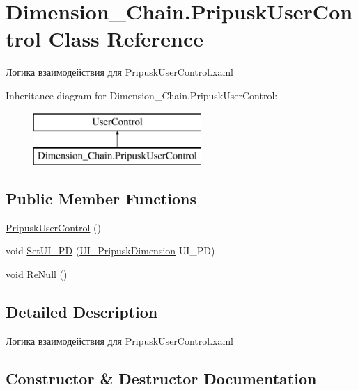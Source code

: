 \hypertarget{class_dimension___chain_1_1_pripusk_user_control}{}\section{Dimension\+\_\+\+Chain.\+Pripusk\+User\+Control Class Reference}
\label{class_dimension___chain_1_1_pripusk_user_control}


Логика взаимодействия для Pripusk\+User\+Control.\+xaml  


Inheritance diagram for Dimension\+\_\+\+Chain.\+Pripusk\+User\+Control\+:\begin{figure}[H]
\begin{center}
\leavevmode
\includegraphics[height=2.000000cm]{class_dimension___chain_1_1_pripusk_user_control}
\end{center}
\end{figure}
\subsection*{Public Member Functions}
\begin{DoxyCompactItemize}
\item 
\mbox{\hyperlink{class_dimension___chain_1_1_pripusk_user_control_a47b71047602454b227feb662ca976281}{Pripusk\+User\+Control}} ()
\item 
void \mbox{\hyperlink{class_dimension___chain_1_1_pripusk_user_control_a4907b2646788dd49f089d3e1e2fd6af4}{Set\+U\+I\+\_\+\+PD}} (\mbox{\hyperlink{class_dimension___chain_1_1_u_i___pripusk_dimension}{U\+I\+\_\+\+Pripusk\+Dimension}} U\+I\+\_\+\+PD)
\item 
void \mbox{\hyperlink{class_dimension___chain_1_1_pripusk_user_control_a15805f1227585bd517f428f0c773d803}{Re\+Null}} ()
\end{DoxyCompactItemize}


\subsection{Detailed Description}
Логика взаимодействия для Pripusk\+User\+Control.\+xaml 



\subsection{Constructor \& Destructor Documentation}
\mbox{\label{class_dimension___chain_1_1_pripusk_user_control_a47b71047602454b227feb662ca976281}} 

